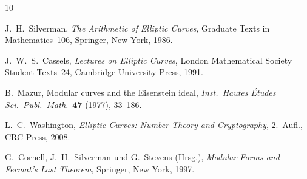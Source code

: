 \documentclass[12pt,a4paper]{amsart}
\theoremstyle{definition}
\begin{document}
\begin{thebibliography}{10}

J.~H.~Silverman,
\emph{The Arithmetic of Elliptic Curves},
Graduate Texts in Mathematics~106,
Springer, New York, 1986.

J.~W.~S.~Cassels,
\emph{Lectures on Elliptic Curves},
London Mathematical Society Student Texts~24,
Cambridge University Press, 1991.

B.~Mazur,
Modular curves and the Eisenstein ideal,
\emph{Inst.\ Hautes \'Etudes Sci.\ Publ.\ Math.}\ \textbf{47} (1977), 33--186.

L.~C.~Washington,
\emph{Elliptic Curves: Number Theory and Cryptography}, 2.~Aufl.,
CRC Press, 2008.

G.~Cornell, J.~H.~Silverman und G.~Stevens (Hrsg.),
\emph{Modular Forms and Fermat's Last Theorem},
Springer, New York, 1997.

\end{thebibliography}
\end{document}
